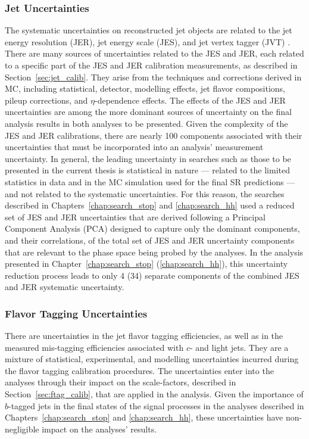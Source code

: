\subsubsection{Jet Uncertainties}
The systematic uncertainties on reconstructed jet objects are related to the jet energy
resolution (JER), jet energy scale (JES), and jet vertex tagger (JVT) {\color{red}{don't forget to describe JVT}}.
There are many sources of uncertainties related to the JES and JER, each related to a specific
part of the JES and JER calibration measurements, as described in Section~\ref{sec:jet_calib}.
They arise from the techniques and corrections derived in MC, including statistical, detector,
modelling effects, jet flavor compositions, pileup corrections, and $\eta$-dependence effects.
The effects of the JES and JER uncertainties are among the more dominant sources of uncertainty
on the final analysis results in both analyses to be presented.
Given the complexity of the JES and JER calibrations, there are nearly 100 components associated with their uncertainties
that must be incorporated into an analysis' measurement uncertainty.
In general, the leading uncertainty in searches such as those to be presented in the current thesis
is statistical in nature --- related to the limited statistics in data and in the MC simulation used
for the final SR predictions ---  and not related to the systematic uncertainties.
For this reason, the searches described in Chapters~\ref{chap:search_stop} and \ref{chap:search_hh}
used a reduced set of JES and JER uncertainties that are derived following a Principal Component Analysis (PCA)
designed to capture only the dominant components, and their correlations, of the total set of JES and JER uncertainty components
that are relevant to the phase space being probed by the analyses.
In the analysis presented in Chapter~\ref{chap:search_stop} (\ref{chap:search_hh}), this uncertainty reduction
process leads to only 4 (34) separate components of the combined JES and JER systematic uncertainty.

\subsubsection{Flavor Tagging Uncertainties}
There are uncertainties in the jet flavor tagging efficiencies, as well as in
the measured mis-tagging efficiencies associated with $c$- and light jets.
They are a mixture of statistical, experimental, and modelling uncertainties
incurred during the flavor tagging calibration procedures.
The uncertainties enter into the analyses through their impact on the scale-factors,
described in Section~\ref{sec:ftag_calib},
that are applied in the analysis.
Given the importance of $b$-tagged jets in the final states of the signal processes
in the analyses described in Chapters~\ref{chap:search_stop} and \ref{chap:search_hh},
these uncertainties have non-negligible impact on the analyses' results.

